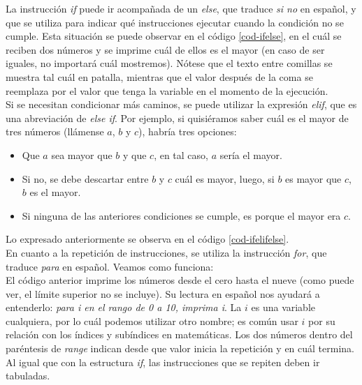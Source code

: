 


La instrucción \emph{if} puede ir acompañada de un \emph{else}, que traduce \emph{si no} en español, y que se utiliza para indicar qué instrucciones ejecutar cuando la condición no se cumple. Esta situación se puede observar en el código \ref{cod-ifelse}, en el cuál se reciben dos números y se imprime cuál de ellos es el mayor (en caso de ser iguales, no importará cuál mostremos). Nótese que el texto entre comillas se muestra tal cuál en patalla, mientras que el valor después de la coma se reemplaza por el valor que tenga la variable en el momento de la ejecución. \\



Si se necesitan condicionar más caminos, se puede utilizar la expresión \emph{elif}, que es una abreviación de \emph{else if}. Por ejemplo, si quisiéramos saber cuál es el mayor de tres números (llámense $a$, $b$ y $c$), habría tres opciones: 
\begin{itemize}
\item Que $a$ sea mayor que $b$ y que $c$, en tal caso, $a$ sería el mayor.

\item Si no, se debe descartar entre $b$ y $c$ cuál es mayor, luego, si $b$ es mayor que $c$, $b$ es el mayor.

\item Si ninguna de las anteriores condiciones se cumple, es porque el mayor era $c$. 
\end{itemize}


Lo expresado anteriormente se observa en el código \ref{cod-ifelifelse}.  \\



En cuanto a la repetición de instrucciones, se utiliza la instrucción \emph{for}, que traduce \emph{para} en español. Veamos como funciona: \\



El código anterior imprime los números desde el cero hasta el nueve (como puede ver, el límite superior no se incluye). Su lectura en español nos ayudará a entenderlo: \emph{para i en el rango de 0 a 10, imprima i}. La $i$ es una variable cualquiera, por lo cuál podemos utilizar otro nombre; es común usar $i$ por su relación con los índices y subíndices en matemáticas. Los dos números dentro del paréntesis de \emph{range} indican desde que valor inicia la repetición y en cuál termina. Al igual que con la estructura \emph{if}, las instrucciones que se repiten deben ir tabuladas.

